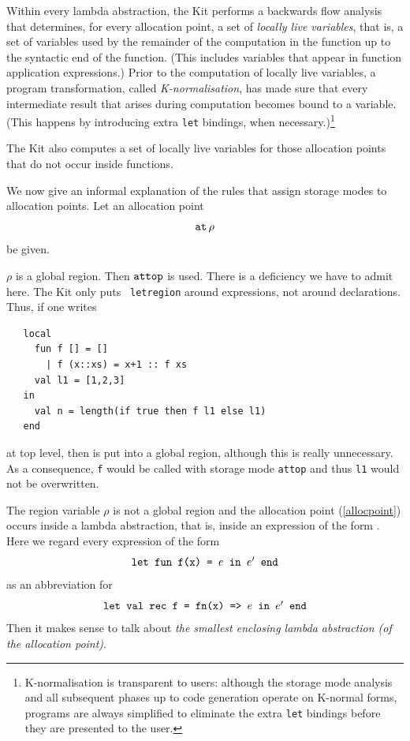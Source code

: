 \documentclass[12pt]{book}
\begin{document}
Within every lambda abstraction, the Kit performs a backwards flow
analysis that determines, for every allocation point, a set of
%
{\em locally live variables}, that is, a set of variables used by the
remainder of the computation in the function up to the syntactic end
of the function. (This includes variables that appear in function
application expressions.) Prior to the computation of locally live
variables, a program transformation, called
%
\label{K-normal-form}%
{\em K-normalisation}, has made sure that every intermediate result
that arises during computation becomes bound to a variable. (This
happens by introducing extra {\tt let} bindings, when
necessary.)\footnote{K-normalisation is transparent to users: although
  the storage mode analysis and all subsequent phases up to code
  generation operate on K-normal forms, programs are always simplified
  to eliminate the extra {\tt let} bindings before they are presented
  to the user.}

The Kit also computes a set of locally live variables for those
allocation points that do not occur inside functions.

We now give an informal explanation of the rules that assign storage
modes to allocation points.  Let an allocation point
\begin{equation}
\label{allocpoint}\mathbin{\hbox{\tt at}}\,\rho
\end{equation}
be given. 
\bigskip

 $\rho$ is a global region. Then $\hbox{\tt attop}$ is used. 
There is a deficiency we have to admit here. The Kit only puts {\tt
  letregion} around expressions, not around declarations. Thus, if one
writes
\begin{verbatim}
   local 
     fun f [] = []
       | f (x::xs) = x+1 :: f xs
     val l1 = [1,2,3]
   in
     val n = length(if true then f l1 else l1)
   end
\end{verbatim}

\noindent
at top level, then  is put into a global region, although
this is really unnecessary. As a consequence, {\tt f} would be called
with storage mode {\tt attop} and thus {\tt l1} would not be
overwritten.  \bigskip

The region variable $\rho$ is not a global region and the allocation
point (\ref{allocpoint}) occurs inside a lambda abstraction, that is,
inside an expression of the form .  Here we
regard every expression of the form
$$\hbox{\tt let fun f(x) = $e$ in $e'$ end}$$ as an abbreviation for
$$\hbox{\tt let val rec f = fn(x) => $e$ in $e'$ end}$$
Then it makes
sense to talk about {\em the smallest enclosing lambda abstraction (of
  the allocation point)}.
\end{document}
